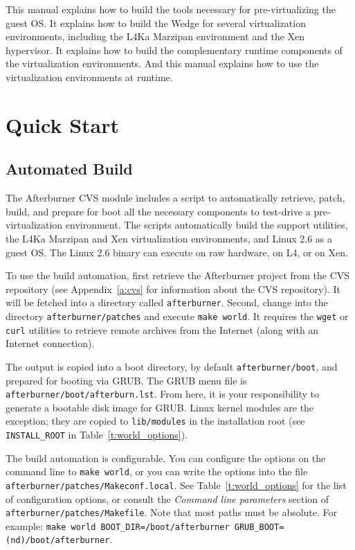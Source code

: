 \documentclass[twoside,a4paper]{report}
\newcommand{\code}[1]{{\tt #1}}
\newcommand{\cmd}[1]{\code{#1}}
\begin{document}
This manual explains how to build the tools necessary for
pre-virtualizing the guest OS.  It explains how to build the Wedge for
several virtualization environments, including the L4Ka Marzipan
environment and the Xen hypervisor.  It explains how to build the
complementary runtime components of the virtualization environments.
And this manual explains how to use the virtualization environments at
runtime.

\chapter{Quick Start}

\section{Automated Build}

The Afterburner CVS module includes a script to automatically
retrieve, patch, build, and prepare for boot all the necessary
components to test-drive a pre-virtualization environment.  The
scripts automatically build the support utilities, the L4Ka Marzipan
and Xen virtualization environments, and Linux 2.6 as a guest OS.
The Linux 2.6 binary can execute on raw hardware, on L4, or on Xen.

To use the build automation, first retrieve the Afterburner project
from the CVS repository (see Appendix~\ref{a:cvs} for information
about the CVS repository).  It will be fetched into a directory called
\code{afterburner}.  Second, change into the directory
\code{afterburner/patches} and execute \cmd{make world}.  It requires
the \code{wget} or \code{curl} utilities to retrieve remote archives
from the Internet (along with an Internet connection).

The output is copied into a boot directory, by default
\code{afterburner/boot}, and prepared for booting via GRUB.  The GRUB
menu file is \code{afterburner/boot/afterburn.lst}.  From here, it is
your responsibility to generate a bootable disk image for GRUB.  Linux
kernel modules are the exception; they are copied to
\code{lib/modules} in the installation root (see \code{INSTALL\_ROOT}
in Table~\ref{t:world_options}).

The build automation is configurable.  You can configure the options on the
command line to \code{make world}, or you can write the options into the
file \code{afterburner/patches/Makeconf.local}.  See
Table~\ref{t:world_options} for the list of configuration options, or
consult the \emph{Command line parameters} section of
\code{afterburner/patches/Makefile}.  Note that most paths must be
absolute.  For example: \cmd{make world BOOT\_DIR=/boot/afterburner
GRUB\_BOOT=(nd)/boot/afterburner}.
\end{document}
